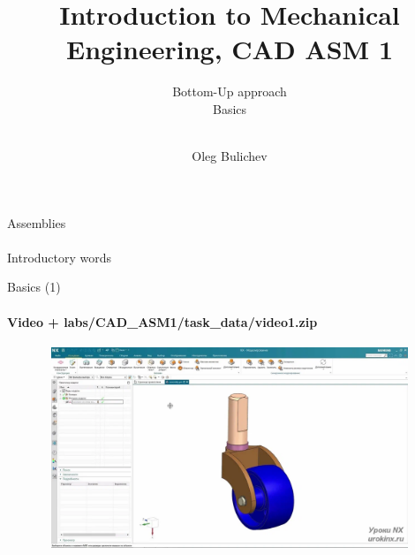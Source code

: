 \documentclass[aspectratio=169]{beamer}
\title[IME]{Introduction to Mechanical Engineering, CAD ASM 1} %
\subtitle{Bottom-Up approach
\\ Basics \\ \ 
         } %
\author{Oleg Bulichev}
\newcommand{\fbckg}[1]{\usebackgroundtemplate{\texttt{[image: \#1]}}}%
\begin{document}
\setlength{\abovedisplayskip}{0pt}
\setlength{\belowdisplayskip}{0pt}
\setlength{\abovedisplayshortskip}{0pt}
\setlength{\belowdisplayshortskip}{0pt}

\fbckg{fibeamer/figs/title_page.png}

\fbckg{fibeamer/figs/common.png}

\note{\scriptsize \begin{itemize}
        \item \
    \end{itemize}}

\note{
   \ 
}

\begin{frame}[c]{Assemblies}
\framesubtitle{}
    \centering
    \Huge
    Introductory words
\end{frame}

\begin{frame}[t]{Basics (1)}
    \framesubtitle{Video + labs/CAD\_ASM1/task\_data/video1.zip}
    \vspace{-0.6cm}
    \begin{figure}[H]
        \href{https://disk.yandex.ru/i/eTpcseXL44F6jQ}{
            \centering\includegraphics[height=6cm,width=1\textwidth,keepaspectratio]{1.png}}
        \label{fig:1}
    \end{figure}
\end{frame}
\end{document}
